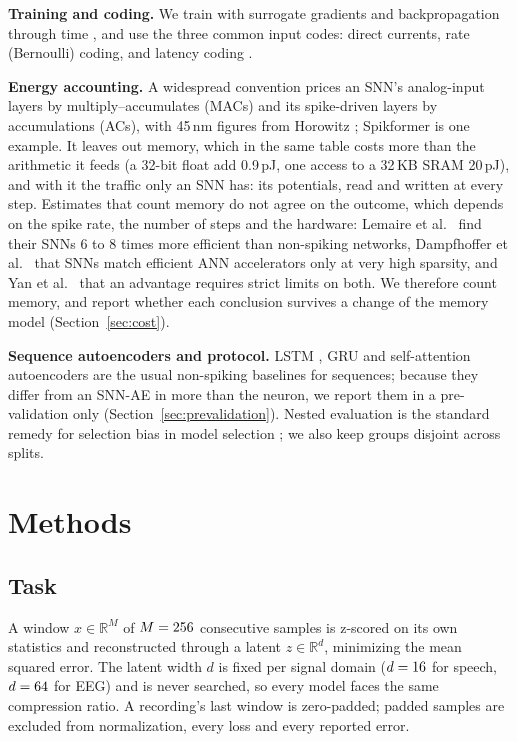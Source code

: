 \documentclass[conference]{IEEEtran}
\begin{document}
\par \textbf{Training and coding.} We train with surrogate gradients and backpropagation
through time \cite{neftci2019surrogate,eshraghian2023training,werbos1990backpropagation}, and
use the three common input codes: direct currents, rate (Bernoulli) coding, and latency coding
\cite{thorpe1998rank,comsa2020temporal}.

\par \textbf{Energy accounting.} A widespread convention prices an SNN's analog-input layers
by multiply--accumulates (MACs) and its spike-driven layers by accumulations (ACs), with
45\,nm figures from Horowitz \cite{horowitz2014computing}; Spikformer
\cite{zhou2023spikformer} is one example. It leaves out memory, which in the same table costs
more than the arithmetic it feeds (a 32-bit float add 0.9\,pJ, one access to a 32\,KB SRAM
20\,pJ), and with it the traffic only an SNN has: its potentials, read and written at every
step. Estimates that count memory do not agree on the outcome, which depends on the spike rate,
the number of steps and the hardware: Lemaire et al.\ \cite{lemaire2022analytical} find their
SNNs 6 to 8 times more efficient than non-spiking networks, Dampfhoffer et al.\
\cite{dampfhoffer2023snns} that SNNs match efficient ANN accelerators only at very high
sparsity, and Yan et al.\ \cite{yan2024reconsidering} that an advantage requires strict limits
on both. We therefore count memory, and report whether each conclusion survives a change of
the memory model (Section~\ref{sec:cost}).

\par \textbf{Sequence autoencoders and protocol.} LSTM \cite{hochreiter1997long,sutskever2014sequence},
GRU \cite{cho2014gru,chung2014gru} and self-attention \cite{vaswani2017attention,ba2016layernorm}
autoencoders are the usual non-spiking baselines for sequences; because they differ from an
SNN-AE in more than the neuron, we report them in a pre-validation only
(Section~\ref{sec:prevalidation}). Nested evaluation is the standard remedy for selection bias
in model selection \cite{cawley2010overfitting}; we also keep groups disjoint across splits.

\section{Methods}

\subsection{Task}
\par A window $x\in\mathbb{R}^M$ of $M=256$ consecutive samples is z-scored on its own
statistics and reconstructed through a latent $z\in\mathbb{R}^d$, minimizing the mean squared
error. The latent width $d$ is fixed per signal domain ($d=16$ for speech,
$d=64$ for EEG) and is never searched, so every model faces the same
compression ratio. A recording's last window is zero-padded; padded samples are excluded from
normalization, every loss and every reported error.
\end{document}
